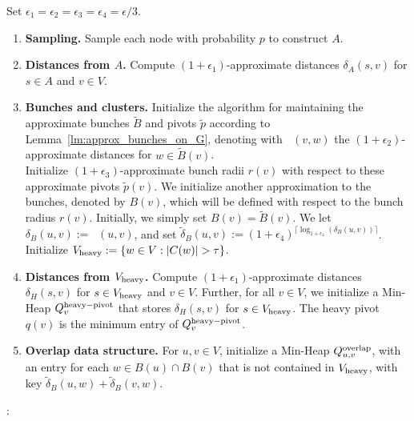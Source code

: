 \documentclass[11pt]{article}
\theoremstyle{definition}
\theoremstyle{remark}
\DeclareMathOperator{\dLNbunch}{\delta_{\tilde{B}}}
\begin{document}
\begin{titlepage}
Set $\epsilon_1=\epsilon_2=\epsilon_3=\epsilon_4=\epsilon/3$.
\begin{enumerate}
    \item \textbf{Sampling.} Sample each node with probability $p$ to construct $A$. \label{step:sampling_moved}
    \item \textbf{Distances from $A$.} Compute $(1+\epsilon_1)$-approximate distances $\delta_A(s,v)$ for $s\in A$ and $v\in V$. 
    \item \textbf{Bunches and clusters.} Initialize the algorithm for maintaining the approximate bunches $\tilde B$ and pivots $\tilde p$ according to Lemma~\ref{lm:approx_bunches_on_G}, denoting with $\dLNbunch(v,w)$ the $(1+\epsilon_2)$-approximate distances for $w\in \tilde B(v)$.\\
    Initialize $(1+\epsilon_3)$-approximate bunch radii $r(v)$ with respect to these approximate pivots $\tilde p(v)$.  \label{step:A_MSSP_moved}
    We initialize another approximation to the bunches, denoted by $B(v)$, which will be defined with respect to the bunch radius $r(v)$. Initially, we simply set $B(v)=\tilde{B}(v)$. We let $\delta_B(u,v):=\dLNbunch(u,v)$, and set $\tilde \delta_B(u,v) := (1+\epsilon_4)^{\lceil \log_{1+\epsilon_4}(\delta_B(u,v))\rceil}$. Initialize $V_{\rm{heavy}}:= \{w\in V : |C(w)|>\tau\}$. \label{step:bunches_moved}
    \item \textbf{Distances from $V_{\rm{heavy}}$.} Compute $(1+\epsilon_1)$-approximate distances $\delta_H(s,v)$ for $s\in V_{\rm{heavy}}$ and $v\in V$. Further, for all $v\in V$, we initialize a Min-Heap $Q^{\rm{heavy-pivot}}_v$ that stores $\delta_H(s,v)$ for $s\in V_{\rm{heavy}}$. The heavy pivot $q(v)$ is the minimum entry of $Q^{\rm{heavy-pivot}}_v$. \label{step:H_MSSP_moved}
    \item \textbf{Overlap data structure.} For $u,v\in V$, initialize a Min-Heap $Q^{\rm{overlap}}_{u,v}$, with an entry for each $w\in B(u)\cap B(v)$ that is not contained in $V_{\rm{heavy}}$, with key $\tilde \delta_B(u,w)+\tilde \delta_B(v,w)$.
\end{enumerate}

\noindent{}:\\
\indent {}\\


\end{titlepage}
\end{document}
